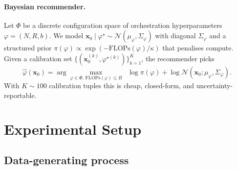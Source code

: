 \documentclass[10pt,a4paper]{article}
\begin{document}
\paragraph{Bayesian recommender.} Let $\Phi$ be a discrete configuration
space of orchestration hyperparameters
$\varphi = (N, R, b)$. We model
$\mathbf{x}_0 \mid \varphi^\star \sim \mathcal{N}(\mu_\varphi,
\Sigma_\varphi)$ with diagonal $\Sigma_\varphi$ and a structured prior
$\pi(\varphi) \propto \exp(-\mathrm{FLOPs}(\varphi) / \kappa)$ that penalises
compute. Given a calibration set
$\{(\mathbf{x}_0^{(k)}, \varphi^{\star(k)})\}_{k=1}^K$, the recommender
picks
\begin{equation}
  \widehat\varphi(\mathbf{x}_0) = \arg\max_{\varphi \in \Phi,\, \mathrm{FLOPs}(\varphi) \leq B}
  \;\; \log \pi(\varphi) + \log \mathcal{N}(\mathbf{x}_0; \mu_\varphi, \Sigma_\varphi).
\end{equation}
With $K\!\sim\!100$ calibration tuples this is cheap, closed-form, and
uncertainty-reportable.

\begin{center}
\end{center}

\section{Experimental Setup}\label{sec:setup_exp}

\subsection{Data-generating process}\label{subsec:dgp}
\end{document}
